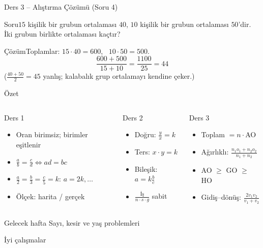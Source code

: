 \documentclass[aspectratio=169,11pt]{beamer}
\newcommand{\soru}[3]{%
\begin{frame}{#1}
  \begin{block}{Soru}\large #2\end{block}
  \pause
  \begin{exampleblock}{Çözüm}\large #3\end{exampleblock}
\end{frame}}
\begin{document}
\soru{Ders 3 -- Alıştırma Çözümü (Soru 4)}
{\(15\) kişilik bir grubun ortalaması \(40\), \(10\) kişilik bir grubun ortalaması \(50\)'dir. İki grubun birlikte ortalaması kaçtır?}
{Toplamlar: \(15\cdot 40=600\), \ \(10\cdot 50=500\).
\[\frac{600+500}{15+10}=\frac{1100}{25}=44\]
(\(\frac{40+50}{2}=45\) yanlış; kalabalık grup ortalamayı kendine çeker.)}


\begin{frame}{Özet}
\begin{columns}[t]
\begin{block}{Ders 1}
\begin{itemize}
\item Oran birimsiz; birimler eşitlenir
\item \(\frac{a}{b}=\frac{c}{d}\Leftrightarrow ad=bc\)
\item \(\frac{a}{2}=\frac{b}{3}=\frac{c}{5}=k\): \(a=2k,\dots\)
\item Ölçek: harita / gerçek
\end{itemize}
\end{block}
\begin{block}{Ders 2}
\begin{itemize}
\item Doğru: \(\frac{y}{x}=k\)
\item Ters: \(x\cdot y=k\)
\item Bileşik: \(a=k\frac{b}{c}\)
\item \(\frac{\text{İş}}{n\cdot s\cdot g}\) sabit
\end{itemize}
\end{block}
\begin{block}{Ders 3}
\begin{itemize}
\item Toplam \(=n\cdot\)AO
\item Ağırlıklı: \(\frac{n_1o_1+n_2o_2}{n_1+n_2}\)
\item AO \(\ge\) GO \(\ge\) HO
\item Gidiş--dönüş: \(\frac{2v_1v_2}{v_1+v_2}\)
\end{itemize}
\end{block}
\end{columns}
\vspace{6pt}
\begin{alertblock}{Gelecek hafta}
Sayı, kesir ve yaş problemleri
\end{alertblock}
\end{frame}

\begin{frame}
\centering\Large İyi çalışmalar
\end{frame}
\end{document}
